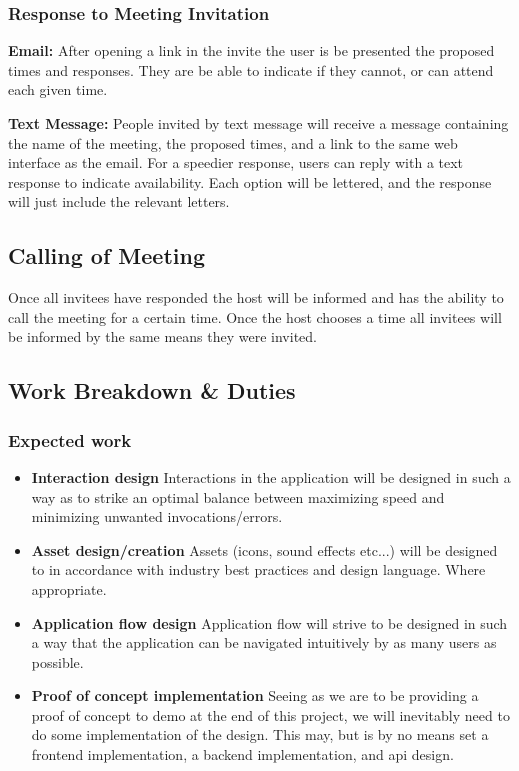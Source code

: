 \documentclass{sigchi}
\begin{document}
\subsubsection{Response to Meeting Invitation}

\textbf{Email:}
After opening a link in the invite the user is be presented the proposed times and responses.
They are be able to indicate if they cannot, or can attend each given time.

\textbf{Text Message:}
People invited by text message will receive a message containing the name of the meeting, 
the proposed times, and a link to the same web interface as the email.
For a speedier response, users can reply with a text response to indicate availability.
Each option will be lettered, and the response will just include the relevant letters.

\subsection{Calling of Meeting}
Once all invitees have responded the host will be informed 
and has the ability to call the meeting for a certain time.
Once the host chooses a time all invitees will be informed by the same means they were invited.


\subsection{Work Breakdown \& Duties}

\subsubsection{Expected work}
\begin{itemize}
\item{\textbf{Interaction design}}
Interactions in the application will be designed in such a way as to strike an optimal balance between maximizing speed and minimizing unwanted invocations/errors.

\item{\textbf{Asset design/creation}}
Assets (icons, sound effects etc...) will be designed to in accordance with industry best practices and design language. Where appropriate.

\item{\textbf{Application flow design}}
Application flow will strive to be designed in such a way that the application can be navigated intuitively by as many users as possible.

\item{\textbf{Proof of concept implementation}}
Seeing as we are to be providing a proof of concept to demo at the end of this project, we will inevitably need to do some implementation of the design. This may, but is by no means set a frontend implementation, a backend implementation, and api design.

\end{itemize}
\end{document}
